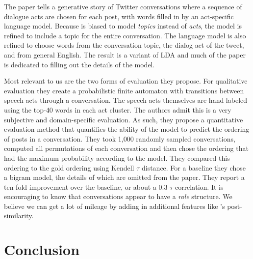 \documentclass{article}
\begin{document}
The paper tells a generative story of Twitter conversations where a sequence of dialogue
acts are chosen for each post, with words filled in by an act-specific language model.
Because is biased to model \textit{topics}
instead of \textit{acts}, the model is refined to include a topic 
for the entire conversation. The language model is also refined to choose words from
the conversation topic, the dialog act of the tweet, and from general English. The result
is a variant of LDA and much of the paper is dedicated to filling out the details of the model.

Most relevant to us are the two forms of evaluation they propose. For
qualitative evaluation they create a probabilistic finite automaton with
transitions between speech acts through a conversation. The speech acts
themselves are hand-labeled using the top-40 words in each act cluster. The 
authors admit this is a very subjective and domain-specific evaluation. As such,
they propose a quantitative evaluation method that quantifies the ability of
the model to predict the ordering of posts in a conversation. They took
1,000 randomly sampled conversations, computed all permutations
of each conversation and then chose the ordering that had the maximum
probability according to the model. They compared this ordering to the gold
ordering using Kendell $\tau$ distance. For a baseline they chose a bigram
model, the details of which are omitted from the paper. They report a ten-fold improvement
over the baseline, or about a 0.3 $\tau$-correlation. It is encouraging to know
that conversations appear to have a \textit{role} structure. We believe we can get a lot of mileage
by adding in additional features like \cite{Wang2008a}'s post-similarity.

\section{Conclusion}

{}

\end{document}
